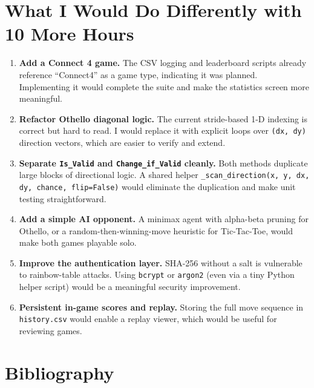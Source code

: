 \documentclass[12pt]{article}
\begin{document}
\section{What I Would Do Differently with 10 More Hours}

\begin{enumerate}
    \item \textbf{Add a Connect 4 game.} The CSV logging and leaderboard scripts already reference ``Connect4'' as a game type, indicating it was planned. Implementing it would complete the suite and make the statistics screen more meaningful.

    \item \textbf{Refactor Othello diagonal logic.} The current stride-based 1-D indexing is correct but hard to read. I would replace it with explicit loops over \texttt{(dx, dy)} direction vectors, which are easier to verify and extend.

    \item \textbf{Separate \texttt{Is\_Valid} and \texttt{Change\_if\_Valid} cleanly.} Both methods duplicate large blocks of directional logic. A shared helper \texttt{\_scan\_direction(x, y, dx, dy, chance, flip=False)} would eliminate the duplication and make unit testing straightforward.

    \item \textbf{Add a simple AI opponent.} A minimax agent with alpha-beta pruning for Othello, or a random-then-winning-move heuristic for Tic-Tac-Toe, would make both games playable solo.

    \item \textbf{Improve the authentication layer.} SHA-256 without a salt is vulnerable to rainbow-table attacks. Using \texttt{bcrypt} or \texttt{argon2} (even via a tiny Python helper script) would be a meaningful security improvement.

    \item \textbf{Persistent in-game scores and replay.} Storing the full move sequence in \texttt{history.csv} would enable a replay viewer, which would be useful for reviewing games.
\end{enumerate}

\section{Bibliography}
\end{document}
